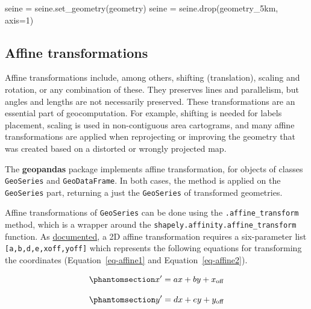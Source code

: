 \documentclass[
  letterpaper,
]{krantz}
\newenvironment{Shaded}{\begin{snugshade}}{\end{snugshade}}
\newcommand{\DecValTok}[1]{\textcolor[rgb]{0.68,0.00,0.00}{#1}}
\newcommand{\NormalTok}[1]{\textcolor[rgb]{0.00,0.23,0.31}{#1}}
\newcommand{\OperatorTok}[1]{\textcolor[rgb]{0.37,0.37,0.37}{#1}}
\newcommand{\StringTok}[1]{\textcolor[rgb]{0.13,0.47,0.30}{#1}}
\begin{document}
\begin{Shaded}
\begin{Highlighting}[]
\NormalTok{seine }\OperatorTok{=}\NormalTok{ seine.set\_geometry(}\StringTok{\textquotesingle{}geometry\textquotesingle{}}\NormalTok{)}
\NormalTok{seine }\OperatorTok{=}\NormalTok{ seine.drop(}\StringTok{\textquotesingle{}geometry\_5km\textquotesingle{}}\NormalTok{, axis}\OperatorTok{=}\DecValTok{1}\NormalTok{)}
\end{Highlighting}
\end{Shaded}

\subsection{Affine transformations}\label{sec-affine-transformations}

Affine transformations include, among others, shifting (translation),
scaling and rotation, or any combination of these. They preserves lines
and parallelism, but angles and lengths are not necessarily preserved.
These transformations are an essential part of geocomputation. For
example, shifting is needed for labels placement, scaling is used in
non-contiguous area cartograms, and many affine transformations are
applied when reprojecting or improving the geometry that was created
based on a distorted or wrongly projected map.

The \textbf{geopandas} package implements affine transformation, for
objects of classes \texttt{GeoSeries} and \texttt{GeoDataFrame}. In both
cases, the method is applied on the \texttt{GeoSeries} part, returning a
just the \texttt{GeoSeries} of transformed geometries.

Affine transformations of \texttt{GeoSeries} can be done using the
\texttt{.affine\_transform} method, which is a wrapper around the
\texttt{shapely.affinity.affine\_transform} function. As
\href{https://shapely.readthedocs.io/en/stable/manual.html\#shapely.affinity.affine_transform}{documented},
a 2D affine transformation requires a six-parameter list
\texttt{{[}a,b,d,e,xoff,yoff{]}} which represents the following
equations for transforming the coordinates (Equation~\ref{eq-affine1}
and Equation~\ref{eq-affine2}).

\begin{equation}\phantomsection\label{eq-affine1}{
x' = a x + b y + x_\mathrm{off}
}\end{equation}

\begin{equation}\phantomsection\label{eq-affine2}{
y' = d x + e y + y_\mathrm{off}
}\end{equation}
\end{document}
